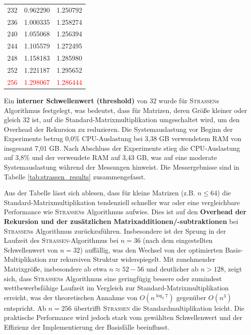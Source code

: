 \documentclass{scrartcl}
\begin{document}
\begin{table}[h!]
\begin{tabularx}{\textwidth}{l | X | X}
		232 & 0.962290 & 1.250792 \\
		236 & 1.000335 & 1.258274 \\
		240 & 1.055068 & 1.256394 \\
		244 & 1.105579 & 1.272495 \\
		248 & 1.158183 & 1.285980 \\
		252 & 1.221187 & 1.295652 \\
		\textcolor{red}{256} & \textcolor{red}{1.298067} & \textcolor{red}{1.286444} \\
		\bottomrule
	\end{tabularx}
\end{table}
Ein \textbf{interner Schwellenwert (threshold)} von 32 wurde für \textsc{Strassen}s Algorithmus festgelegt, was bedeutet, dass für Matrizen, deren Größe kleiner oder gleich 32 ist, auf die Standard-Matrixmultiplikation umgeschaltet wird, um den Overhead der Rekursion zu reduzieren. Die Systemauslastung vor Beginn der Experimente betrug 0,0\% CPU-Auslastung bei 3,38 GB verwendetem RAM von insgesamt 7,01 GB. Nach Abschluss der Experimente stieg die CPU-Auslastung auf 3,8\% und der verwendete RAM auf 3,43 GB, was auf eine moderate Systemauslastung während der Messungen hinweist. Die Messergebnisse sind in Tabelle \ref{tab:strassen_results} zusammengefasst.

Aus der Tabelle lässt sich ablesen, dass für kleine Matrizen (z.B. $n \le 64$) die Standard-Matrixmultiplikation tendenziell schneller war oder eine vergleichbare Performance wie \textsc{Strassen}s Algorithmus aufwies. Dies ist auf den \textbf{Overhead der Rekursion und der zusätzlichen Matrixadditionen/-subtraktionen} bei \textsc{Strassen}s Algorithmus zurückzuführen. Insbesondere ist der Sprung in der Laufzeit des \textsc{Strassen}-Algorithmus bei $n=36$ (nach dem eingestellten Schwellenwert von $n=32$) auffällig, was den Wechsel von der optimierten Basis-Multiplikation zur rekursiven Struktur widerspiegelt. Mit zunehmender Matrixgröße, insbesondere ab etwa $n \approx 52-56$ und deutlicher ab $n > 128$, zeigt sich, dass \textsc{Strassen}s Algorithmus eine geringfügig bessere oder zumindest wettbewerbsfähige Laufzeit im Vergleich zur Standard-Matrixmultiplikation erreicht, was der theoretischen Annahme von $O(n^{\log_2 7})$ gegenüber $O(n^3)$ entspricht. Ab $n=256$ übertrifft \textsc{Strassen} die Standardmultiplikation leicht. Die praktische Performance wird jedoch stark vom gewählten Schwellenwert und der Effizienz der Implementierung der Basisfälle beeinflusst.
\end{document}
